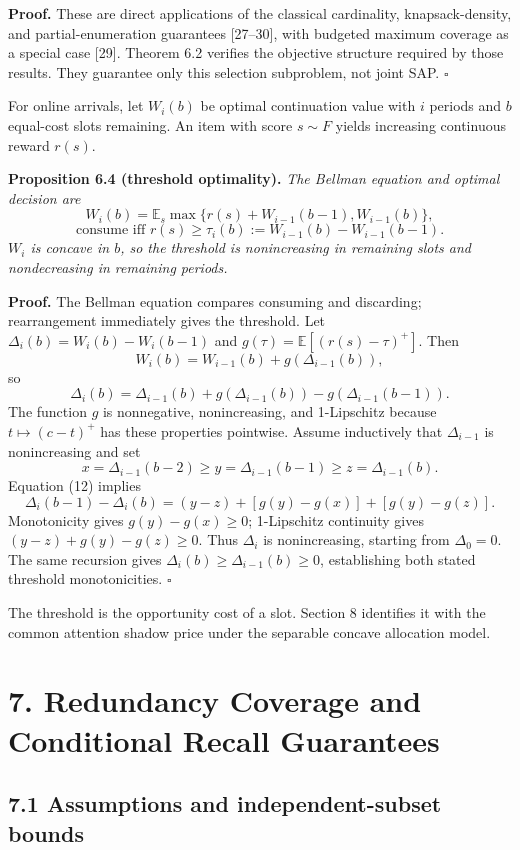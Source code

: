\documentclass[
  11pt]{article}
\begin{document}
\textbf{Proof.} These are direct applications of the classical cardinality, knapsack-density, and partial-enumeration guarantees {[}27--30{]}, with budgeted maximum coverage as a special case {[}29{]}. Theorem 6.2 verifies the objective structure required by those results. They guarantee only this selection subproblem, not joint SAP. \(\square\)

For online arrivals, let \(W_i(b)\) be optimal continuation value with \(i\) periods and \(b\) equal-cost slots remaining. An item with score \(s\sim F\) yields increasing continuous reward \(r(s)\).

\textbf{Proposition 6.4 (threshold optimality).} \emph{The Bellman equation and optimal decision are} \[
W_i(b)=\mathbb E_s\max\{r(s)+W_{i-1}(b-1),W_{i-1}(b)\},
\] \[
\text{consume iff }r(s)\geq\tau_i(b):=W_{i-1}(b)-W_{i-1}(b-1).
\] \emph{\(W_i\) is concave in \(b\), so the threshold is nonincreasing in remaining slots and nondecreasing in remaining periods.}

\textbf{Proof.} The Bellman equation compares consuming and discarding; rearrangement immediately gives the threshold. Let \(\Delta_i(b)=W_i(b)-W_i(b-1)\) and \(g(\tau)=\mathbb E[(r(s)-\tau)^+]\). Then \[
W_i(b)=W_{i-1}(b)+g(\Delta_{i-1}(b)),
\] so \[
\Delta_i(b)=\Delta_{i-1}(b)+g(\Delta_{i-1}(b))-g(\Delta_{i-1}(b-1)).
\tag{12}
\] The function \(g\) is nonnegative, nonincreasing, and 1-Lipschitz because \(t\mapsto(c-t)^+\) has these properties pointwise. Assume inductively that \(\Delta_{i-1}\) is nonincreasing and set \[
x=\Delta_{i-1}(b-2)\geq y=\Delta_{i-1}(b-1)\geq z=\Delta_{i-1}(b).
\] Equation (12) implies \[
\Delta_i(b-1)-\Delta_i(b)
=(y-z)+[g(y)-g(x)]+[g(y)-g(z)].
\] Monotonicity gives \(g(y)-g(x)\geq0\); 1-Lipschitz continuity gives \((y-z)+g(y)-g(z)\geq0\). Thus \(\Delta_i\) is nonincreasing, starting from \(\Delta_0=0\). The same recursion gives \(\Delta_i(b)\geq\Delta_{i-1}(b)\geq0\), establishing both stated threshold monotonicities. \(\square\)

The threshold is the opportunity cost of a slot. Section 8 identifies it with the common attention shadow price under the separable concave allocation model.

\section{7. Redundancy Coverage and Conditional Recall Guarantees}\label{redundancy-coverage-and-conditional-recall-guarantees}

\subsection{7.1 Assumptions and independent-subset bounds}\label{assumptions-and-independent-subset-bounds}
\end{document}
